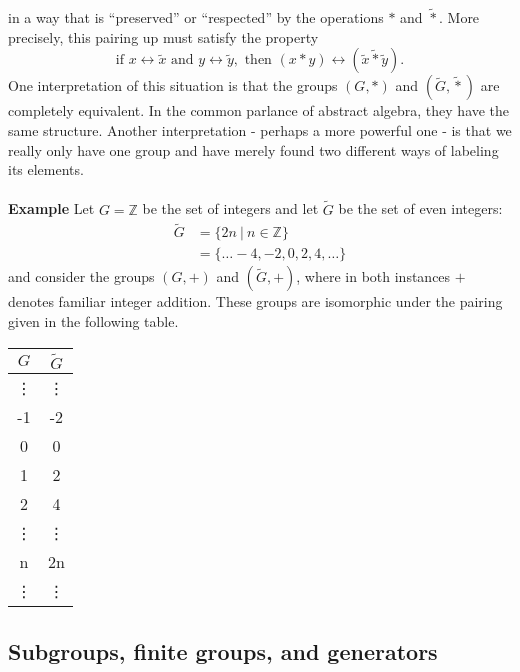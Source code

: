 \documentclass[12 pt]{article}
\newcommand{\Z}{\mathbb{Z}}
\numberwithin{equation}{section}
\begin{document}
in a way that is ``preserved'' or ``respected'' by the operations $*$ and $\tilde{*}$. More precisely, this pairing up must satisfy the property \begin{equation}\label{giso}
\mbox{if } x \leftrightarrow \tilde{x} \mbox{ and } y \leftrightarrow \tilde{y}, \mbox{ then } (x * y) \leftrightarrow (\tilde{x} \tilde{*} \tilde{y}) .
\end{equation}
One interpretation of this situation is that the groups $(G, *)$ and $(\tilde{G}, \tilde{*})$ are completely equivalent. In the common parlance of abstract algebra, they have the same structure. Another interpretation - perhaps a more powerful one - is that we really only have one group and have merely found two different ways of labeling its elements.
\
\\
\\
\textbf{Example} Let $G = \Z$ be the set of integers and let $\tilde{G}$ be the set of even integers: \begin{align*}
\tilde{G} & = \{ 2n \ | \ n \in \Z \} \\
\ & = \{\ldots -4, -2, 0, 2, 4, \ldots\}
\end{align*}
and consider the groups $(G, +)$ and $(\tilde{G}, +)$, where in both instances $+$ denotes familiar integer addition. These groups are isomorphic under the pairing given in the following table. \begin{center}
\begin{tabular}{c | c}
$G$ & $\tilde{G}$ \\
\hline
\vdots & \vdots \\
-1 & -2 \\
0 & 0 \\
1 & 2 \\
2 & 4 \\
\vdots & \vdots \\
n & 2n \\
\vdots & \vdots
\end{tabular}
\end{center}














\subsection{Subgroups, finite groups, and generators}
\end{document}
